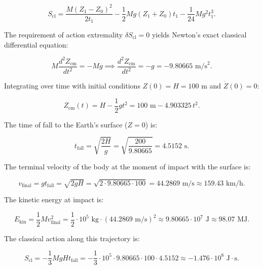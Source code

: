 \documentclass[11pt,a4paper]{article}
\theoremstyle{definition}
\begin{document}
\begin{equation}\label{eq:5.23}\tag{5.23}
S_{\text{cl}} = \frac{M (Z_1 - Z_0)^2}{2 t_1} - \frac{1}{2} M g (Z_1 + Z_0) t_1 - \frac{1}{24} M g^2 t_1^3.
\end{equation}

The requirement of action extremality $\delta S_{\text{cl}} = 0$ yields Newton's exact classical differential equation:

\begin{equation}\label{eq:5.24}\tag{5.24}
M \frac{d^2 Z_{\text{cm}}}{dt^2} = - M g \implies \frac{d^2 Z_{\text{cm}}}{dt^2} = - g = - 9.80665\text{ m/s}^2.
\end{equation}

Integrating over time with initial conditions $Z(0) = H = 100\text{ m}$ and $\dot{Z}(0) = 0$:

\begin{equation}\label{eq:5.25}\tag{5.25}
Z_{\text{cm}}(t) = H - \frac{1}{2} g t^2 = 100\text{ m} - 4.903325\,t^2.
\end{equation}

The time of fall to the Earth's surface ($Z = 0$) is:

\begin{equation}\label{eq:5.26}\tag{5.26}
t_{\text{fall}} = \sqrt{\frac{2 H}{g}} = \sqrt{\frac{200}{9.80665}} = 4.5152\text{ s}.
\end{equation}

The terminal velocity of the body at the moment of impact with the surface is:

\begin{equation}\label{eq:5.27}\tag{5.27}
v_{\text{final}} = g t_{\text{fall}} = \sqrt{2 g H} = \sqrt{2 \cdot 9.80665 \cdot 100} = 44.2869\text{ m/s} \approx 159.43\text{ km/h}.
\end{equation}

The kinetic energy at impact is:

\begin{equation}\label{eq:5.28}\tag{5.28}
E_{\text{kin}} = \frac{1}{2} M v_{\text{final}}^2 = \frac{1}{2} \cdot 10^5\text{ kg} \cdot (44.2869\text{ m/s})^2 \approx 9.80665 \cdot 10^7\text{ J} \approx 98.07\text{ MJ}.
\end{equation}

The classical action along this trajectory is:

\begin{equation}\label{eq:5.29}\tag{5.29}
S_{\text{cl}} = - \frac{1}{3} M g H t_{\text{fall}} = - \frac{1}{3} \cdot 10^5 \cdot 9.80665 \cdot 100 \cdot 4.5152 \approx - 1.476 \cdot 10^8\text{ J}\cdot\text{s}.
\end{equation}
\end{document}
